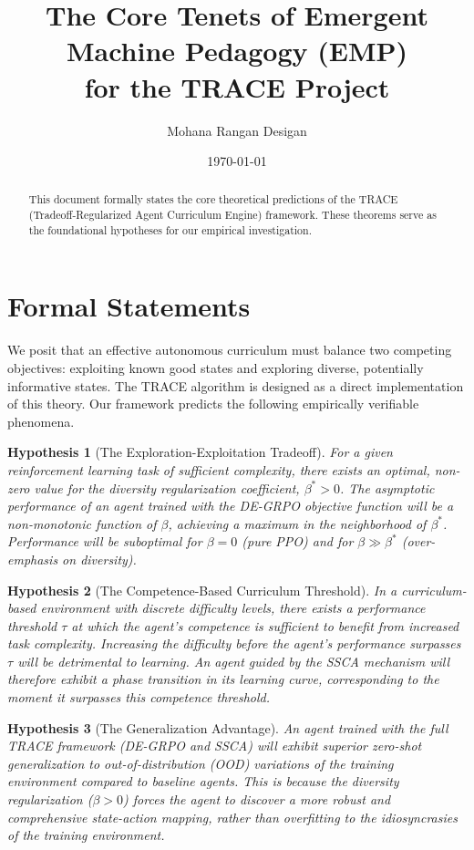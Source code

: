 \documentclass[11pt, a4paper]{article}
\title{The Core Tenets of Emergent Machine Pedagogy (EMP) \\ for the TRACE Project}
\author{Mohana Rangan Desigan}
\date{\today}
\newtheorem{hypothesis}{Hypothesis}[section]
\begin{document}
\maketitle

\begin{abstract}
    This document formally states the core theoretical predictions of the TRACE (Tradeoff-Regularized Agent Curriculum Engine) framework. These theorems serve as the foundational hypotheses for our empirical investigation.
\end{abstract}

\section{Formal Statements}

We posit that an effective autonomous curriculum must balance two competing objectives: exploiting known good states and exploring diverse, potentially informative states. The TRACE algorithm is designed as a direct implementation of this theory. Our framework predicts the following empirically verifiable phenomena.

\begin{hypothesis}[The Exploration-Exploitation Tradeoff]
    \label{thm:tradeoff}
    For a given reinforcement learning task of sufficient complexity, there exists an optimal, non-zero value for the diversity regularization coefficient, $\beta^* > 0$. The asymptotic performance of an agent trained with the DE-GRPO objective function will be a non-monotonic function of $\beta$, achieving a maximum in the neighborhood of $\beta^*$. Performance will be suboptimal for $\beta=0$ (pure PPO) and for $\beta \gg \beta^*$ (over-emphasis on diversity).
\end{hypothesis}

\begin{hypothesis}[The Competence-Based Curriculum Threshold]
    \label{thm:threshold}
    In a curriculum-based environment with discrete difficulty levels, there exists a performance threshold $\tau$ at which the agent's competence is sufficient to benefit from increased task complexity. Increasing the difficulty before the agent's performance surpasses $\tau$ will be detrimental to learning. An agent guided by the SSCA mechanism will therefore exhibit a phase transition in its learning curve, corresponding to the moment it surpasses this competence threshold.
\end{hypothesis}

\begin{hypothesis}[The Generalization Advantage]
    \label{thm:generalization}
    An agent trained with the full TRACE framework (DE-GRPO and SSCA) will exhibit superior zero-shot generalization to out-of-distribution (OOD) variations of the training environment compared to baseline agents. This is because the diversity regularization ($\beta > 0$) forces the agent to discover a more robust and comprehensive state-action mapping, rather than overfitting to the idiosyncrasies of the training environment.
\end{hypothesis}
\end{document}
